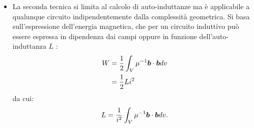 \begin{itemize}
\begin{figure}
\end{figure}

In questo modo è possibile calcolare il flusso concatenato ad un circuito indipendentemente dalla sorgente del campo magnetico. Opportunamente utilizzata, questa tecnica permette quindi il calcolo, oltre che di auto-induttanze, anche di mutue induttanze e contro-tensioni originate da magneti in movimento (come attuatori lineari e motori).
\item La seconda tecnica si limita al calcolo di auto-induttanze ma è applicabile a qualunque circuito indipendentemente dalla complessità geometrica. Si basa sull'espressione dell'energia magnetica, che per un circuito induttivo può essere espressa  in dipendenza dai campi oppure in funzione dell'auto-induttanza $L$ \citep{furlani_permanent_2001}:
\begin{align}
\label{eq:5ind4a}
W &= \frac{1}{2}\int_V \mu^{-1} \boldsymbol{b}\cdot\boldsymbol{b} dv\\
\label{eq:5ind4b}
&= \frac{1}{2} L i^2
\end{align}
da cui:
\begin{equation}
\label{eq:5ind5}
L = \frac{1}{i^2} \int_V  \mu^{-1} \boldsymbol{b}\cdot\boldsymbol{b} dv.
\end{equation}
\end{itemize}

